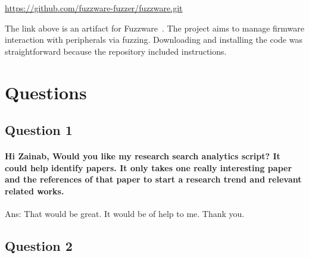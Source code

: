 \url{https://github.com/fuzzware-fuzzer/fuzzware.git}

The link above is an artifact for  Fuzzware~\cite{scharnowski2022fuzzware}. The project aims to manage firmware interaction with peripherals via fuzzing. Downloading and installing the code was straightforward because the repository included instructions.






\section{Questions}
\subsection{Question 1}
\paragraph{Hi Zainab, Would you like my research search analytics script? It could help identify papers. It only takes one really interesting paper and the references of that paper to start a research trend and relevant related works.}

Ans: That would be great. It would be of help to me. Thank you.
\subsection{Question 2}
\paragraph{}

%
